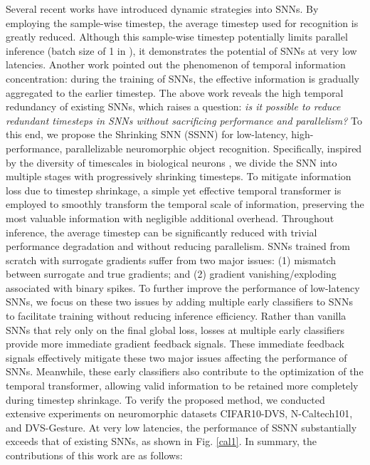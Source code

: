 \documentclass[letterpaper]{article} %
\begin{document}
Several recent works \cite{li2023unleashing,SEENN} have introduced dynamic strategies into SNNs. By employing the sample-wise timestep, the average timestep used for recognition is greatly reduced. Although this sample-wise timestep potentially limits parallel inference (batch size of 1 in \cite{li2023unleashing}), it demonstrates the potential of SNNs at very low latencies. Another work \cite{kim2022exploring} pointed out the phenomenon of temporal information concentration: during the training of SNNs, the effective information is gradually aggregated to the earlier timestep. The above work reveals the high temporal redundancy of existing SNNs, which raises a question: \textit{is it possible to reduce redundant timesteps in SNNs without sacrificing performance and parallelism?} To this end, we propose the Shrinking SNN (SSNN) for low-latency, high-performance, parallelizable neuromorphic object recognition. Specifically, inspired by the diversity of timescales in biological neurons \cite{10.3389/fncir.2020.615626}, we divide the SNN into multiple stages with progressively shrinking timesteps. To mitigate information loss due to timestep shrinkage, a simple yet effective temporal transformer is employed to smoothly transform the temporal scale of information, preserving the most valuable information with negligible additional overhead. Throughout inference, the average timestep can be significantly reduced with trivial performance degradation and without reducing parallelism.
SNNs trained from scratch with surrogate gradients suffer from two major issues: (1) mismatch between surrogate and true gradients; and (2) gradient vanishing/exploding associated with binary spikes. To further improve the performance of low-latency SNNs, we focus on these two issues by adding multiple early classifiers to SNNs to facilitate training without reducing inference efficiency. Rather than vanilla SNNs that rely only on the final global loss, losses at multiple early classifiers provide more immediate gradient feedback signals. These immediate feedback signals effectively mitigate these two major issues affecting the performance of SNNs. Meanwhile, these early classifiers also contribute to the optimization of the temporal transformer, allowing valid information to be retained more completely during timestep shrinkage.
To verify the proposed method, we conducted extensive experiments on neuromorphic datasets CIFAR10-DVS, N-Caltech101, and DVS-Gesture. At very low latencies, the performance of SSNN substantially exceeds that of existing SNNs, as shown in Fig. \ref{cal1}. In summary, the contributions of this work are as follows:
\end{document}
